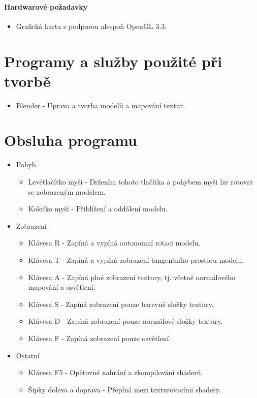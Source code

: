 \documentclass[12pt,a4paper,titlepage,final]{report}
\begin{document}
\paragraph{Hardwarové požadavky}
\begin{itemize}
	\item Grafická karta s podporou alespoň OpenGL 3.3.
\end{itemize}

\section{Programy a služby použité při tvorbě}
\begin{itemize}
	\item Blender - Úprava a tvorba modelů a mapování textur.
\end{itemize}

\section{Obsluha programu}
\begin{itemize}
	\item Pohyb
		\begin{itemize}
			\item Levétlačítko myši - Držením tohoto tlačítka a pohybem myši lze rotovat se zobrazeným modelem.
			\item Kolečko myši - Přiblížení a oddálení modelu.
		\end{itemize}
	\item Zobrazení
		\begin{itemize}

			\item Klávesa R - Zapíná a vypíná autonomní rotaci modelu.
			\item Klávesa T - Zapíná a vypíná zobrazení tangentního prostoru modelu.
			\item Klávesa A - Zapíná plné zobrazení textury, tj. včetně normálového mapování a osvětlení.
			\item Klávesa S - Zapíná zobrazení pouze barevné složky textury.		\item Klávesa D - Zapíná zobrazení pouze normálové složky textury.
			\item Klávesa F - Zapíná zobrazení pouze osvětlení.
		\end{itemize}
	\item Ostatní
		\begin{itemize}
			\item Klávesa F5 - Opětovné nahrání a zkompilování shaderů.
			\item Šipky doleva a doprava - Přepíná mezi texturovacími shadery.
		\end{itemize}
\end{itemize}
\end{document}
